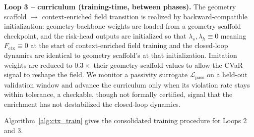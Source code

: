 \textbf{Loop 3 -- curriculum (training-time, between phases).}
The geometry scaffold $\rightarrow$ context-enriched field transition is realized by backward-compatible
initialization: geometry-backbone weights are loaded from a geometry scaffold
checkpoint, and the risk-head outputs are initialized so that
$\lambda_s, \lambda_h \equiv 0$ meaning $F_{\mathrm{ctx}} \equiv 0$
at the start of context-enriched field training and the closed-loop dynamics are
identical to geometry scaffold's at that initialization. Imitation weights are
reduced to $0.3{\times}$ their geometry-scaffold values to allow the CVaR signal
to reshape the field. We monitor a passivity surrogate
$\mathcal{L}_{\mathrm{pass}}$ on a held-out validation
window and advance the curriculum only when its violation rate stays
within tolerance, a checkable, though not formally certified, signal
that the enrichment has not destabilized the closed-loop dynamics.

Algorithm~\ref{alg:ctx_train} gives the consolidated training
procedure for Loops 2 and 3.

